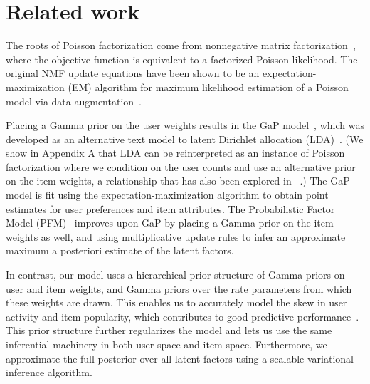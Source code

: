 \section{Related work}
The roots of Poisson factorization come from nonnegative matrix
factorization~\cite{Lee:1999}, where the objective function is
equivalent to a factorized Poisson likelihood.  The original NMF
update equations have been shown to be an expectation-maximization
(EM) algorithm for maximum likelihood estimation of a Poisson model
via data augmentation~\cite{Cemgil:2009}.

Placing a Gamma prior on the user weights results in the GaP
model~\cite{Canny:2004}, which was developed as an alternative text
model to latent Dirichlet allocation (LDA)~\cite{Blei:2003b}. (We show
in Appendix A that LDA can be reinterpreted as an instance of Poisson
factorization where we condition on the user counts and use an
alternative prior on the item weights, a relationship that has also
been explored in ~\cite{Inouye:2014}.) The GaP model is fit using the
expectation-maximization algorithm to obtain point estimates for user
preferences and item attributes. The Probabilistic Factor Model
(PFM)~\cite{Ma:2011} improves upon GaP by placing a Gamma prior on the
item weights as well, and using multiplicative update rules to infer
an approximate maximum a posteriori estimate of the latent factors.

In contrast, our model uses a hierarchical prior structure of Gamma
priors on user and item weights, and Gamma priors over the rate
parameters from which these weights are drawn. This enables us to
accurately model the skew in user activity and item popularity, which
contributes to good predictive performance~\cite{Koren:2009}. This
prior structure further regularizes the model and lets us use the same
inferential machinery in both user-space and item-space. Furthermore,
we approximate the full posterior over all latent factors using a
scalable variational inference algorithm.



